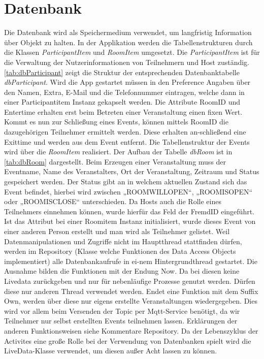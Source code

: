 \section{Datenbank}
\label{sec:Datenbank}
Die Datenbank wird als Speichermedium verwendet, um langfristig Information über Objekt zu halten. 
In der Applikation werden die Tabellenstrukturen durch die Klassen \textit{ParticipantItem} und \textit{RoomItem} umgesetzt. 
Die \textit{ParticipantItem} ist für die Verwaltung der Nutzerinformationen von Teilnehmern und Host zuständig. \cref{tab:dbParticipant} zeigt die Struktur der entsprechenden Datenbanktabelle \textit{dbParticipant}.
 Wird die App gestartet müssen in den Preference Angaben über den Namen, Extra, E-Mail und die Telefonnummer eintragen, welche dann in einer Participantitem Instanz gekapselt werden. 
Die Attribute RoomID und Entertime erhalten erst beim Betreten einer Veranstaltung einen fixen Wert. Kommt es nun zur Schließung eines Events, können mittels RoomID die dazugehörigen Teilnehmer ermittelt werden. 
Diese erhalten an-schließend eine Exittime und werden aus dem Event entfernt.
Die Tabellenstruktur der Events wird über die \textit{RoomItem} realisiert. Der Aufbau der Tabelle \textit{dbRoom} ist in \cref{tab:dbRoom} dargestellt. 
Beim Erzeugen einer Veranstaltung muss der Eventname, Name des Veranstalters, Ort der Veranstaltung, Zeitraum und Status gespeichert werden. 
Der Status gibt an in welchem aktuellen Zustand sich das Event befindet, hierbei wird zwischen „ROOMWILLOPEN“, „ROOMISOPEN“ oder „ROOMISCLOSE“ unterschieden.
Da Hosts auch die Rolle eines Teilnehmers einnehmen können, wurde hierfür das Feld der FremdID eingeführt. 
Ist das Attribut bei einer Roomitem Instanz initialisiert, wurde dieses Event von einer anderen Person erstellt und man wird als Teilnehmer gelistet.
Weil Datenmanipulationen und Zugriffe nicht im Hauptthread stattfinden dürfen, werden im Repository (Klasse welche Funktionen des Data Access Objects implementiert) alle Datenbankaufrufe in ei-nem Hintergrundthread gestartet.
Die Ausnahme bilden die Funktionen mit der Endung Now. 
Da bei diesen keine Livedata zurückgeben und nur für nebenläufige Prozesse genutzt werden. 
Dürfen diese nur anderen Thread verwendet werden. Endet eine Funktion mit dem Suffix Own, werden über diese nur eigens erstellte Veranstaltungen wiedergegeben.
 Dies wird vor allem beim Versenden der Topic per Mqtt-Service benötigt, da wir Teilnehmer nur selbst erstellten Events teilnehmen lassen. Erklärungen der anderen Funktionsweisen siehe Kommentare Repository.
Da der Lebenszyklus der Activites eine große Rolle bei der Verwendung von Datenbanken spielt wird die LiveData-Klasse verwendet, um diesen außer Acht lassen zu können. 

